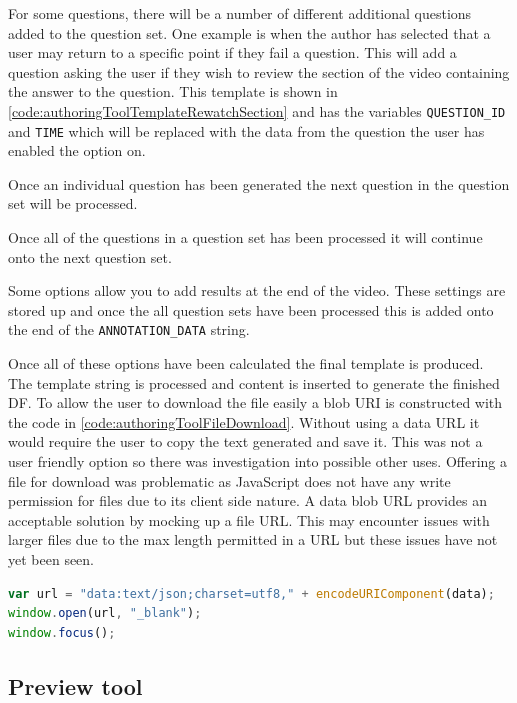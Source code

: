 For some questions, there will be a number of different additional questions added to the question set. One example is when the author has selected that a user may return to a specific point if they fail a question. This will add a question asking the user if they wish to review the section of the video containing the answer to the question. This template is shown in \autoref{code:authoringToolTemplateRewatchSection} and has the variables \lstinline|QUESTION_ID| and \lstinline|TIME| which will be replaced with the data from the question the user has enabled the option on.

Once an individual question has been generated the next question in the question set will be processed.

Once all of the questions in a question set has been processed it will continue onto the next question set.

Some options allow you to add results at the end of the video. These settings are stored up and once the all question sets have been processed this is added onto the end of the \lstinline|ANNOTATION_DATA| string.

Once all of these options have been calculated the final template is produced. The template string is processed and content is inserted to generate the finished \gls{DF}. To allow the user to download the file easily a \gls{blob} URI is constructed with the code in \autoref{code:authoringToolFileDownload}. Without using a data URL it would require the user to copy the text generated and save it. This was not a user friendly option so there was investigation into possible other uses. Offering a file for download was problematic as JavaScript does not have any write permission for files due to its client side nature. A data \gls{blob} URL provides an acceptable solution by mocking up a file URL. This may encounter issues with larger files due to the max length permitted in a URL but these issues have not yet been seen.

\begin{lstlisting}[language=javascript,caption={The final \gls{DF} is offered for downloading using a data \gls{blob} URL},label={code:authoringToolFileDownload} ]
var url = "data:text/json;charset=utf8," + encodeURIComponent(data);
window.open(url, "_blank");
window.focus();
\end{lstlisting}

\subsection{Preview tool}

